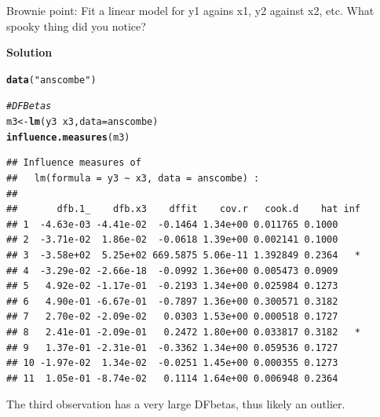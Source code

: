 \documentclass{article}\usepackage[]{graphicx}\usepackage[]{color}
\makeatletter
\newcommand{\hlstr}[1]{\textcolor[rgb]{0.192,0.494,0.8}{#1}}%
\newcommand{\hlcom}[1]{\textcolor[rgb]{0.678,0.584,0.686}{\textit{#1}}}%
\newcommand{\hlopt}[1]{\textcolor[rgb]{0,0,0}{#1}}%
\newcommand{\hlstd}[1]{\textcolor[rgb]{0.345,0.345,0.345}{#1}}%
\newcommand{\hlkwb}[1]{\textcolor[rgb]{0.69,0.353,0.396}{#1}}%
\newcommand{\hlkwc}[1]{\textcolor[rgb]{0.333,0.667,0.333}{#1}}%
\newcommand{\hlkwd}[1]{\textcolor[rgb]{0.737,0.353,0.396}{\textbf{#1}}}%
\newenvironment{kframe}{%
 \def\at@end@of@kframe{}%
 \ifinner\ifhmode%
  \def\at@end@of@kframe{\end{minipage}}%
  \begin{minipage}{\columnwidth}%
 \fi\fi%
 \def\FrameCommand##1{\hskip\@totalleftmargin \hskip-\fboxsep
 \colorbox{shadecolor}{##1}\hskip-\fboxsep
     \hskip-\linewidth \hskip-\@totalleftmargin \hskip\columnwidth}%
 \MakeFramed {\advance\hsize-\width
   \@totalleftmargin\z@ \linewidth\hsize
   \@setminipage}}%
 {\par\unskip\endMakeFramed%
 \at@end@of@kframe}
\newenvironment{knitrout}{}{} %
\makeatother
\begin{document}
Brownie point: Fit a linear model for y1 agains x1, y2 against x2, etc. What spooky thing did you notice?

\textbf{Solution}

\begin{knitrout}
\color{fgcolor}\begin{kframe}
\begin{alltt}
\hlkwd{data}\hlstd{(}\hlstr{"anscombe"}\hlstd{)}

\hlcom{# DFBetas}
\hlstd{m3} \hlkwb{<-} \hlkwd{lm}\hlstd{(y3} \hlopt{~} \hlstd{x3,} \hlkwc{data} \hlstd{= anscombe)}
\hlkwd{influence.measures}\hlstd{(m3)}
\end{alltt}
\begin{verbatim}
## Influence measures of
## 	 lm(formula = y3 ~ x3, data = anscombe) :
## 
##       dfb.1_    dfb.x3    dffit    cov.r   cook.d    hat inf
## 1  -4.63e-03 -4.41e-02  -0.1464 1.34e+00 0.011765 0.1000    
## 2  -3.71e-02  1.86e-02  -0.0618 1.39e+00 0.002141 0.1000    
## 3  -3.58e+02  5.25e+02 669.5875 5.06e-11 1.392849 0.2364   *
## 4  -3.29e-02 -2.66e-18  -0.0992 1.36e+00 0.005473 0.0909    
## 5   4.92e-02 -1.17e-01  -0.2193 1.34e+00 0.025984 0.1273    
## 6   4.90e-01 -6.67e-01  -0.7897 1.36e+00 0.300571 0.3182    
## 7   2.70e-02 -2.09e-02   0.0303 1.53e+00 0.000518 0.1727    
## 8   2.41e-01 -2.09e-01   0.2472 1.80e+00 0.033817 0.3182   *
## 9   1.37e-01 -2.31e-01  -0.3362 1.34e+00 0.059536 0.1727    
## 10 -1.97e-02  1.34e-02  -0.0251 1.45e+00 0.000355 0.1273    
## 11  1.05e-01 -8.74e-02   0.1114 1.64e+00 0.006948 0.2364
\end{verbatim}
\end{kframe}
\end{knitrout}

The third observation has a very large DFbetas, thus likely an outlier.
\end{document}
